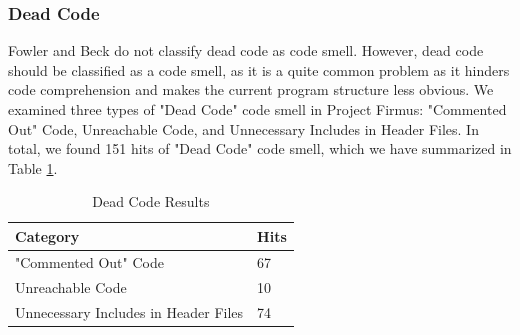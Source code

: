 



\subsubsection{Dead Code}
Fowler and Beck\cite{1999:RID:311424} do not classify dead code as code smell. However, dead code should be classified as a code smell, as it is a quite common problem as it hinders code comprehension and makes the current program structure less obvious\cite{mantyla2003taxonomy}. We examined three types of "Dead Code" code smell in Project Firmus: "Commented Out" Code, Unreachable Code, and Unnecessary Includes in Header Files. In total, we found 151 hits of "Dead Code" code smell, which we have summarized in Table \ref{tab:deadCode}.

\begin{table}[]
\centering
\caption{Dead Code Results}
\label{tab:deadCode}
\begin{tabular}{|l|l|}
\hline
\textbf{Category}		& 	\textbf{Hits} \\ \hline
"Commented Out" Code 			&	67  \\ \hline
Unreachable Code 	& 	10	 \\ \hline
Unnecessary Includes in Header Files 	& 	74	 \\ \hline
\end{tabular}
\end{table}









































